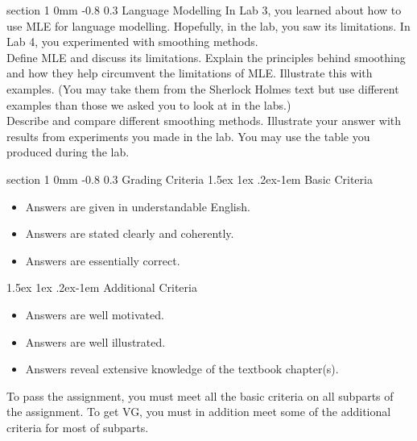 \documentclass[11pt]{article}
\makeatletter
\newenvironment{titlemize}[1]{%
    \paragraph{#1}
    \begin{itemize}
        \setlength\itemsep{0pt}}
    {\end{itemize}}
\renewcommand{\section}{\@startsection
{section}%
{1}%
{0mm}%
{-0.8\baselineskip}%
{0.3\baselineskip}%
{\bfseries\large}}%
\renewcommand{\paragraph}{%
  \@startsection{paragraph}{4}%
  {\z@}{1.5ex \@plus 1ex \@minus .2ex}{-1em}%
  {\normalfont\normalsize\bfseries}%
}\makeatother
\makeatother
\begin{document}
\section{Language Modelling}
\indent In Lab 3, you learned about how to use MLE for language modelling.
Hopefully, in the lab, you saw its limitations. 
In Lab 4, you experimented with smoothing methods.\\
\indent Define MLE and discuss its limitations. Explain the principles behind
smoothing and how they help circumvent the limitations of MLE. Illustrate this
with examples. (You may take them from the Sherlock Holmes text but use
different examples than those we asked you to look at in the labs.)\\
\indent Describe and compare different smoothing methods.  Illustrate your
answer with results from experiments you made in the lab. You may use the table
you produced during the lab.

\section{Grading Criteria}
\begin{titlemize}{Basic Criteria}
\item Answers are given in understandable English.
\item Answers are stated clearly and coherently.
\item Answers are essentially correct.
\end{titlemize}
\begin{titlemize}{Additional Criteria}
\item Answers are well motivated.
\item Answers are well illustrated.
\item Answers reveal extensive knowledge of the textbook chapter(s).
\end{titlemize}
To pass the assignment, you must meet all the basic criteria on all subparts of the assignment. 
To get VG, you must in addition meet some of the additional criteria for most of subparts.
\end{document}
